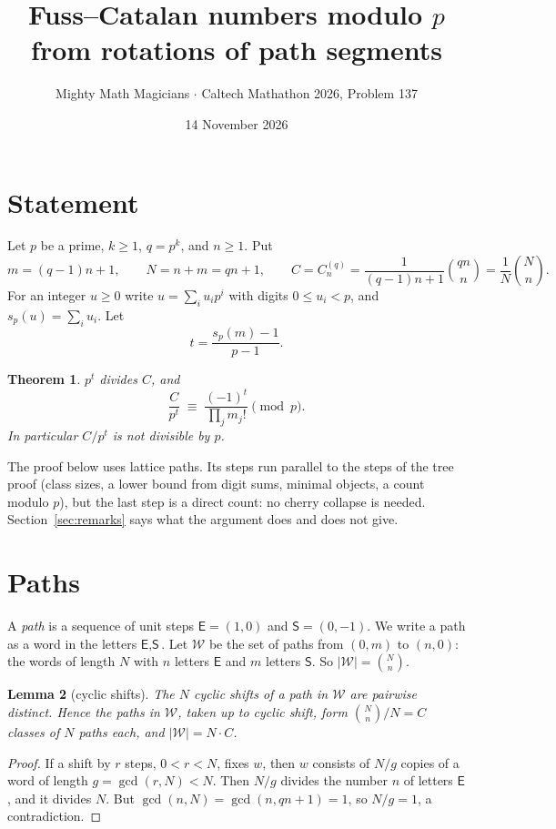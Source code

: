 \documentclass[11pt]{article}
\title{Fuss--Catalan numbers modulo $p$\\ from rotations of path segments}
\author{Mighty Math Magicians $\cdot$ Caltech Mathathon 2026, Problem 137}
\date{14 November 2026}
\newtheorem{theorem}{Theorem}
\newtheorem{lemma}[theorem]{Lemma}
\theoremstyle{definition}
\theoremstyle{remark}
\newcommand{\E}{\textsf{E}}
\newcommand{\Ss}{\textsf{S}}
\newcommand{\W}{\mathcal{W}}
\begin{document}
\maketitle
\vspace{-1.5em}

\begin{center}
\end{center}

\section{Statement}

Let $p$ be a prime, $k\ge 1$, $q=p^k$, and $n\ge 1$. Put
\[
m=(q-1)n+1,\qquad N=n+m=qn+1,\qquad
C=C^{(q)}_n=\frac{1}{(q-1)n+1}\binom{qn}{n}=\frac1N\binom Nn .
\]
For an integer $u\ge 0$ write $u=\sum_i u_i p^i$ with digits $0\le u_i<p$, and $s_p(u)=\sum_i u_i$. Let
\[
t=\frac{s_p(m)-1}{p-1}.
\]

\begin{theorem}\label{thm:main}
$p^t$ divides $C$, and
\[
\frac{C}{p^t}\;\equiv\;\frac{(-1)^t}{\prod_j m_j!}\pmod p .
\]
In particular $C/p^t$ is not divisible by $p$.
\end{theorem}

The proof below uses lattice paths. Its steps run parallel to the steps of the tree proof (class sizes, a lower
bound from digit sums, minimal objects, a count modulo $p$), but the last step is a direct count: no cherry
collapse is needed. Section~\ref{sec:remarks} says what the argument does and does not give.

\section{Paths}

A \emph{path} is a sequence of unit steps $\E=(1,0)$ and $\Ss=(0,-1)$. We write a path as a word in the
letters $\E,\Ss$. Let $\W$ be the set of paths from $(0,m)$ to $(n,0)$: the words of length $N$ with $n$ letters
$\E$ and $m$ letters $\Ss$. So $|\W|=\binom Nn$.

\begin{lemma}[cyclic shifts]\label{lem:shift}
The $N$ cyclic shifts of a path in $\W$ are pairwise distinct. Hence the paths in $\W$, taken up to cyclic
shift, form $\binom Nn/N=C$ classes of $N$ paths each, and $|\W|=N\cdot C$.
\end{lemma}
\begin{proof}
If a shift by $r$ steps, $0<r<N$, fixes $w$, then $w$ consists of $N/g$ copies of a word of length $g=\gcd(r,N)<N$.
Then $N/g$ divides the number $n$ of letters $\E$, and it divides $N$. But $\gcd(n,N)=\gcd(n,qn+1)=1$, so
$N/g=1$, a contradiction.
\end{proof}
\end{document}
